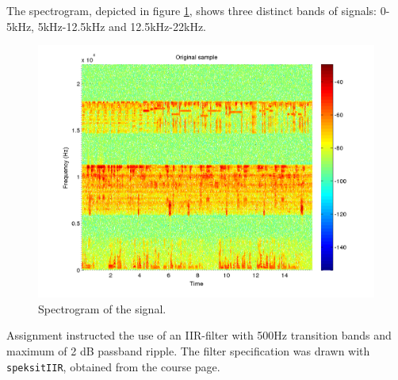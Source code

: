 The spectrogram, depicted in figure \ref{fig:q1_spectrogram}, shows
three distinct bands of signals: 0-5kHz, 5kHz-12.5kHz and 12.5kHz-22kHz.

\begin{figure}
  \begin{center}
    \hspace*{-1in}
    \includegraphics[width=180mm]{q1_spectrogram}
    \caption{Spectrogram of the signal. \label{fig:q1_spectrogram}}
  \end{center}  
\end{figure}

Assignment instructed the use of an IIR-filter with 500Hz transition
bands and maximum of 2 dB passband ripple.  The filter specification was
drawn with {\tt speksitIIR}, obtained from the course page.
